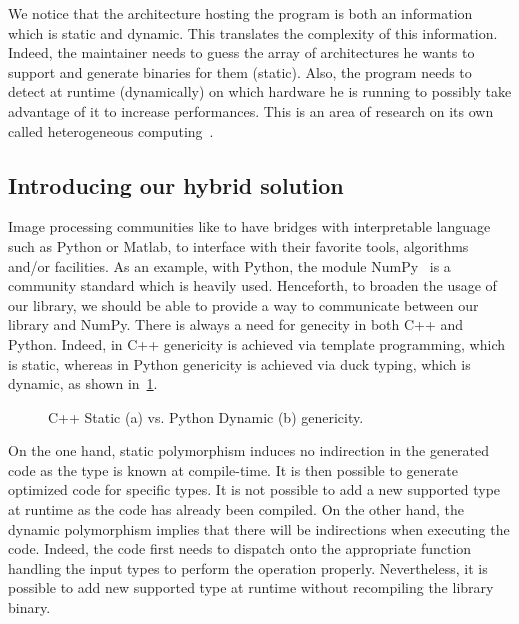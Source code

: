 We notice that the architecture hosting the program is both an information which is static and dynamic. This translates
the complexity of this information. Indeed, the maintainer needs to guess the array of architectures he wants to support
and generate binaries for them (static). Also, the program needs to detect at runtime (dynamically) on which hardware he
is running to possibly take advantage of it to increase performances. This is an area of research on its own called
heterogeneous computing~\parencite{wong.2019.heterogeneous,brown.2019.heterogeneous}.


\subsection{Introducing our hybrid solution}

Image processing communities like to have bridges with interpretable language such as Python or Matlab, to interface
with their favorite tools, algorithms and/or facilities. As an example, with Python, the module
NumPy~\cite{oliphant.2006.numpy} is a community standard which is heavily used. Henceforth, to broaden the usage of our
library, we should be able to provide a way to communicate between our library and NumPy. There is always a need for
genecity in both C++ and Python. Indeed, in C++ genericity is achieved via template programming, which is static,
whereas in Python genericity is achieved via duck typing, which is dynamic, as shown
in~\cref{fig:static.vs.dynamic.genericity}.

\begin{figure}[htbp]
  \centering
  \hfil
  \caption{C++ Static (a) vs. Python Dynamic (b) genericity.}
  \label{fig:static.vs.dynamic.genericity}
\end{figure}

On the one hand, static polymorphism induces no indirection in the generated code as the type is known at compile-time.
It is then possible to generate optimized code for specific types. It is not possible to add a new supported type at
runtime as the code has already been compiled. On the other hand, the dynamic polymorphism implies that there will be
indirections when executing the code. Indeed, the code first needs to dispatch onto the appropriate function handling
the input types to perform the operation properly. Nevertheless, it is possible to add new supported type at runtime
without recompiling the library binary.

